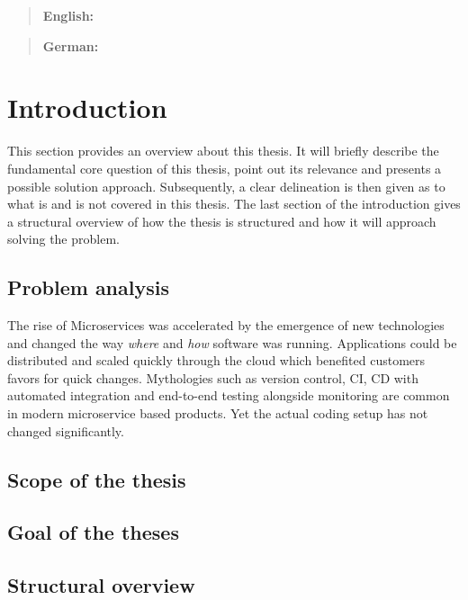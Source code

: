\documentclass[12pt, a4paper]{article}
\begin{document}


\tableofcontents
\newpage

\setcounter{lastroman}{\value{page}}

\maketitle
\begin{abstract}
    \textbf{English:} \lipsum[20]
\end{abstract}
\begin{abstract}
    \textbf{German:} \lipsum[20]
\end{abstract}
\newpage

\section{Introduction}
This section provides an overview about this thesis. It will briefly describe the fundamental core question of this thesis, point out its relevance and presents a possible solution approach. Subsequently, a clear delineation is then given as to what is and is not covered in this thesis. The last section of the introduction gives a structural overview of how the thesis is structured and how it will approach solving the problem.
    \subsection{Problem analysis}
    The rise of Microservices was accelerated by the emergence of new technologies and changed the way \textit{where} and \textit{how} software was running. Applications could be distributed and scaled quickly through the cloud which benefited customers favors for quick changes. Mythologies such as version control, \ac*{CI}, \ac*{CD} with automated integration and end-to-end testing alongside monitoring are common in modern microservice based products. Yet the actual coding setup has not changed significantly.
    \subsection{Scope of the thesis}
    \subsection{Goal of the theses}
    \subsection{Structural overview}
    \newpage
\end{document}

